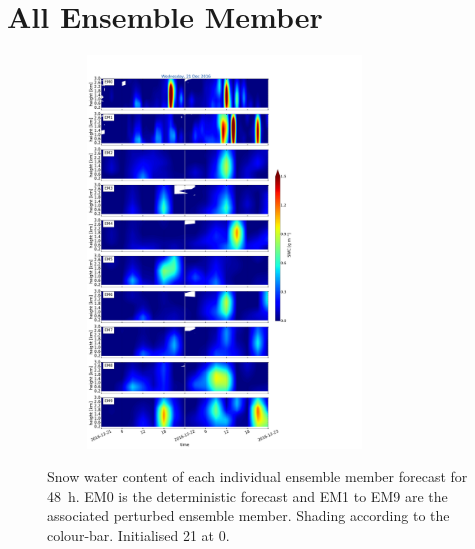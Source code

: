 
\section{All Ensemble Member}%
\label{app:vert_ensmemb09}

\begin{figure}[h]%
	\centering
	\begin{subfigure}[t]{\textwidth} 
		\centering
		\includegraphics[trim={0cm 0cm 18.3cm 5.1cm},clip,width=0.8\textwidth]{./fig_09EM/20161221}
		\caption{}\label{fig:EM09_21}
	\end{subfigure}
    \caption{Snow water content of each individual ensemble member forecast for \SI{48}{\hour}. EM0 is the deterministic forecast and EM1 to EM9 are the associated perturbed ensemble member. Shading according to the colour-bar. Initialised \SI{21}{\dec} at \SI{0}{\UTC}.}\label{fig:EM09}
\end{figure}
